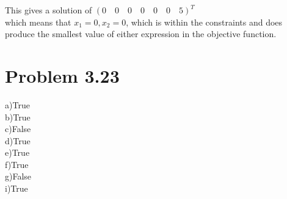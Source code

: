 \documentclass[a4paper,12pt]{article}
\begin{document}
This gives a solution of \( (0 \quad 0 \quad 0 \quad 0 \quad 0 \quad 0 \quad 5)^T \)\\  which means
that \( x_1 = 0, x_2 = 0 \), which is within the constraints and does produce the smallest value
of either expression in the objective function.

\section*{Problem 3.23}
a)True\\b)True\\c)False\\d)True\\e)True\\f)True\\g)False\\i)True
\end{document}

